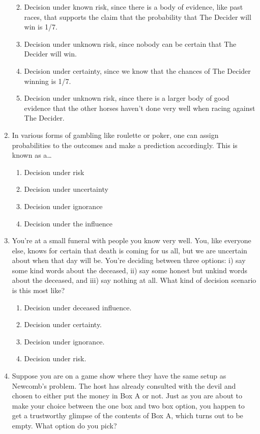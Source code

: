 \documentclass[]{tufte-book}
\providecommand{\tightlist}{%
  \setlength{\itemsep}{0pt}\setlength{\parskip}{0pt}}
\begin{document}
\begin{enumerate}
  \begin{enumerate}
  \def\labelenumii{\alph{enumii}.}
  \tightlist
  \item
    Decision under known risk, since there is a body of evidence, like past races, that supports the claim that the probability that The Decider will win is 1/7.
  \item
    Decision under unknown risk, since nobody can be certain that The Decider will win.
  \item
    Decision under certainty, since we know that the chances of The Decider winning is 1/7.
  \item
    Decision under unknown risk, since there is a larger body of good evidence that the other horses haven't done very well when racing against The Decider.
  \end{enumerate}
\item
  In various forms of gambling like roulette or poker, one can assign probabilities to the outcomes and make a prediction accordingly. This is known as a\ldots{}

  \begin{enumerate}
  \def\labelenumii{\alph{enumii}.}
  \tightlist
  \item
    Decision under risk
  \item
    Decision under uncertainty
  \item
    Decision under ignorance
  \item
    Decision under the influence
  \end{enumerate}
\item
  You're at a small funeral with people you know very well. You, like everyone else, knows for certain that death is coming for us all, but we are uncertain about when that day will be. You're deciding between three options: i) say some kind words about the deceased, ii) say some honest but unkind words about the deceased, and iii) say nothing at all. What kind of decision scenario is this most like?

  \begin{enumerate}
  \def\labelenumii{\alph{enumii}.}
  \tightlist
  \item
    Decision under deceased influence.
  \item
    Decision under certainty.
  \item
    Decision under ignorance.
  \item
    Decision under risk.
  \end{enumerate}
\item
  Suppose you are on a game show where they have the same setup as Newcomb's problem. The host has already consulted with the devil and chosen to either put the money in Box A or not. Just as you are about to make your choice between the one box and two box option, you happen to get a trustworthy glimpse of the contents of Box A, which turns out to be empty. What option do you pick?


\end{enumerate}
\end{document}
